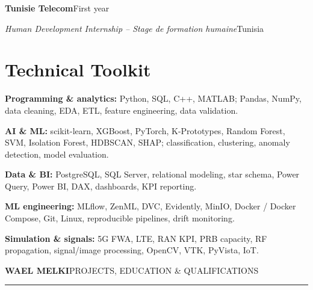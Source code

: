 \documentclass[10pt,a4paper]{article}
\newcommand{\job}[4]{%
  \needspace{6\baselineskip}%
  \textbf{\color{navy}#1}\hfill{\fontsize{8.8}{10}\selectfont\color{gray}#2}\par
  {\fontsize{9.25}{11}\selectfont\textit{#3}\hfill\color{gray}#4}\par
}
\begin{document}
\job{Tunisie Telecom}{First year}{Human Development Internship -- Stage de formation humaine}{Tunisia}
\vspace{3pt}
\section{Technical Toolkit}
{\fontsize{9.35}{11.8}\selectfont
\textbf{Programming \& analytics:} Python, SQL, C++, MATLAB; Pandas, NumPy, data cleaning, EDA, ETL, feature engineering, data validation.\par\vspace{3pt}
\textbf{AI \& ML:} scikit-learn, XGBoost, PyTorch, K-Prototypes, Random Forest, SVM, Isolation Forest, HDBSCAN, SHAP; classification, clustering, anomaly detection, model evaluation.\par\vspace{3pt}
\textbf{Data \& BI:} PostgreSQL, SQL Server, relational modeling, star schema, Power Query, Power BI, DAX, dashboards, KPI reporting.\par\vspace{3pt}
\textbf{ML engineering:} MLflow, ZenML, DVC, Evidently, MinIO, Docker / Docker Compose, Git, Linux, reproducible pipelines, drift monitoring.\par\vspace{3pt}
\textbf{Simulation \& signals:} 5G FWA, LTE, RAN KPI, PRB capacity, RF propagation, signal/image processing, OpenCV, VTK, PyVista, IoT.\par
}

\newpage
\vspace*{6pt}
{\fontsize{11}{13}\selectfont\bfseries\color{navy}WAEL MELKI}\hfill{\fontsize{9}{11}\selectfont\color{gray}PROJECTS, EDUCATION \& QUALIFICATIONS}\par
\vspace{2pt}\color{line}\hrule\color{ink}
\end{document}
